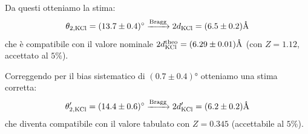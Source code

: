 Da questi otteniamo la stima:
\begin{equation}
\theta_{2,\ce{KCl}} = (13.7 \pm 0.4) \unit{\degree} \xrightarrow[]{\text{Bragg}} 2d_{\ce{KCl}} = (6.5 \pm 0.2) \unit{\angstrom}
\end{equation}
che è compatibile con il valore nominale $ 2d_{\ce{KCl}}^\text{theo} = (6.29 \pm 0.01) \unit{\angstrom}$ (con $Z = 1.12$, accettato al $5 \%$).

Correggendo per il bias sistematico di $ (0.7 \pm 0.4) \unit{\degree} $ otteniamo una stima corretta:
\begin{equation}
\theta_{2,\ce{KCl}}' = (14.4 \pm 0.6) \unit{\degree} \xrightarrow[]{\text{Bragg}} 2d_{\ce{KCl}}' = (6.2 \pm 0.2) \unit{\angstrom}
\end{equation}
che diventa compatibile con il valore tabulato con $ Z = 0.345 $ (accettabile al $ 5 \% $).

